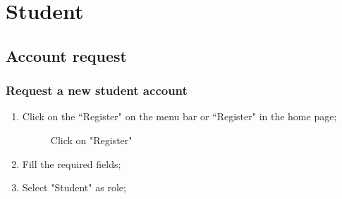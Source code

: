 \documentclass[ManualeUtente]{subfiles}
\begin{document}
\chapter{Student}
\section{Account request}
\subsection{Request a new student account}
\begin{enumerate}
	\item Click on the \textquotedblleft Register" on the menu bar or \textquotedblleft Register" in the home page;
	\begin{figure}[H]
		\centering
		\caption{Click on "Register"}
		\label{fig:Click on "Register"}
	\end{figure}
	\item Fill the required fields;
	\item Select "Student" as role;
	\begin{figure}[H]
		\centering

\end{figure}
\end{enumerate}
\end{document}
